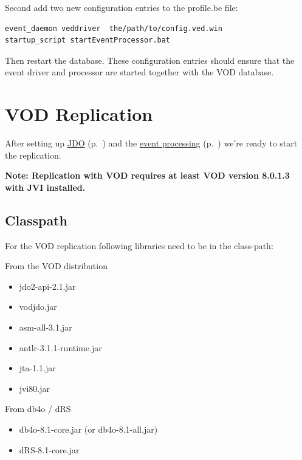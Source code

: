 Second add two new configuration entries to the profile.be file:

\begin{lstlisting}
event_daemon veddriver  the/path/to/config.ved.win
startup_script startEventProcessor.bat
\end{lstlisting}

Then restart the database. These configuration entries should ensure that the event driver and processor are started together with the VOD database.

\section{VOD Replication}
\label{drs:db4o-replication-system-drs-vod-vod-replication}

After setting up \hyperref[drs:db4o-replication-system-drs-vod-setup]{JDO} (p.~\pageref{drs:db4o-replication-system-drs-vod-setup}) and the \hyperref[drs:db4o-replication-system-drs-vod-setup-event-processing]{event processing} (p.~\pageref{drs:db4o-replication-system-drs-vod-setup-event-processing}) we're ready to start the replication.

\textbf{Note: Replication with VOD requires at least VOD version 8.0.1.3 with JVI installed.}

\subsection*{Classpath}

For the VOD replication following libraries need to be in the class-path:

From the VOD distribution

\begin{itemize}
\item jdo2-api-2.1.jar
\item vodjdo.jar
\item asm-all-3.1.jar
\item antlr-3.1.1-runtime.jar
\item jta-1.1.jar
\item jvi80.jar
\end{itemize}

From db4o / dRS

\begin{itemize}
\item db4o-8.1-core.jar (or db4o-8.1-all.jar)
\item dRS-8.1-core.jar
\end{itemize}

